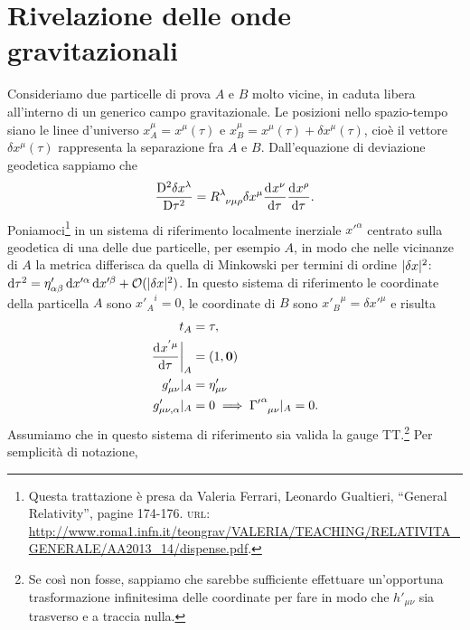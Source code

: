 \section{Rivelazione delle onde gravitazionali}
\label{sec:rivelazione-onde}

Consideriamo due particelle di prova $A$ e $B$ molto vicine, in caduta libera
all'interno di un generico campo gravitazionale.  Le posizioni nello
spazio-tempo siano le linee d'universo $x^{\mu}_{A} = x^{\mu}(\tau)$ e
$x^{\mu}_{B} = x^{\mu}(\tau) + \delta x^{\mu}(\tau)$, cioè il vettore $\delta
x^{\mu}(\tau)$ rappresenta la separazione fra $A$ e $B$.  Dall'equazione di
deviazione geodetica sappiamo che
\begin{equation}
  \label{eq:onde-grav-dev-geo}
  \curder[2]{\delta x^{\lambda}} = \tensor{R}{^{\lambda}_{\nu\mu\rho}} \delta
  x^{\mu} \toder{x^{\nu}}{\tau} \toder{x^{\rho}}{\tau}.
\end{equation}
Poniamoci\footnote{Questa trattazione è presa da Valeria Ferrari, Leonardo
  Gualtieri, ``General Relativity'', pagine 174-176.  \textsc{url}:
  \url{http://www.roma1.infn.it/teongrav/VALERIA/TEACHING/RELATIVITA_GENERALE/AA2013_14/dispense.pdf}.}
in un sistema di riferimento localmente inerziale $x'^{\alpha}$ centrato sulla
geodetica di una delle due particelle, per esempio $A$, in modo che nelle
vicinanze di $A$ la metrica differisca da quella di Minkowski per termini di
ordine $\lvert\delta x\rvert^{2}$: $\mathop{}\!\mathrm{d} \tau^{2} = \eta'_{\alpha \beta}\mathop{}\!\mathrm{d}
x'^{\alpha}\mathop{}\!\mathrm{d} x'^{\beta} + \mathcal{O}(\lvert\delta x\rvert^{2})$.  In questo sistema
di riferimento le coordinate della particella $A$ sono ${x'_{A}}^{i} = 0$, le
coordinate di $B$ sono ${x'_{B}}^{\mu} = \delta x'^{\mu}$ e risulta
\begin{subequations}
  \begin{align}
    t_{A} &= \tau, \\
    \label{eq:foo-geodetica-A}
    \toder{x^{' \mu}}{\tau}\bigg|_{A} &= (1, \bm{0}) \\
    g'_{\mu \nu}|_{A} &= \eta'_{\mu\nu} \\
    g'_{\mu\nu,\alpha}|_{A} &= 0 \implies
    \tensor{{\Gamma'}}{^{\alpha}_{\mu\nu}}|_{A} = 0.
  \end{align}
\end{subequations}
Assumiamo che in questo sistema di riferimento sia valida la gauge
TT.\footnote{Se così non fosse, sappiamo che sarebbe sufficiente effettuare
  un'opportuna trasformazione infinitesima delle coordinate per fare in modo che
  $h'_{\mu\nu}$ sia trasverso e a traccia nulla.}  Per semplicità di notazione,

